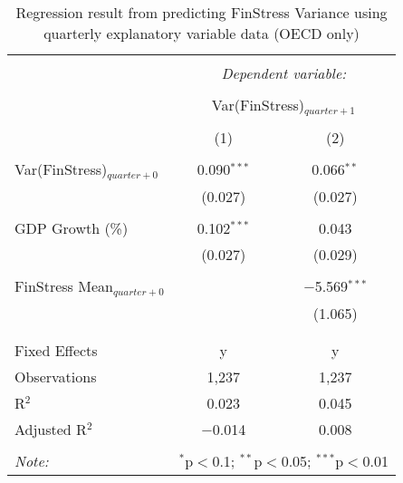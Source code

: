 
\begin{table}[!htbp] \centering 
  \caption{Regression result from predicting FinStress Variance using quarterly explanatory variable data (OECD only)} 
  \label{quarterly_reg} 
\small 
\begin{tabular}{@{\extracolsep{5pt}}lcc} 
\\[-1.8ex]\hline 
\hline \\[-1.8ex] 
 & \multicolumn{2}{c}{\textit{Dependent variable:}} \\ 
\cline{2-3} 
\\[-1.8ex] & \multicolumn{2}{c}{Var(FinStress)$_{quarter+1}$} \\ 
\\[-1.8ex] & (1) & (2)\\ 
\hline \\[-1.8ex] 
 Var(FinStress)$_{quarter + 0}$ & 0.090$^{***}$ & 0.066$^{**}$ \\ 
  & (0.027) & (0.027) \\ 
  & & \\ 
 GDP Growth (\%) & 0.102$^{***}$ & 0.043 \\ 
  & (0.027) & (0.029) \\ 
  & & \\ 
 FinStress Mean$_{quarter + 0}$ &  & $-$5.569$^{***}$ \\ 
  &  & (1.065) \\ 
  & & \\ 
\hline \\[-1.8ex] 
Fixed Effects & y & y \\ 
Observations & 1,237 & 1,237 \\ 
R$^{2}$ & 0.023 & 0.045 \\ 
Adjusted R$^{2}$ & $-$0.014 & 0.008 \\ 
\hline 
\hline \\[-1.8ex] 
\textit{Note:}  & \multicolumn{2}{r}{$^{*}$p$<$0.1; $^{**}$p$<$0.05; $^{***}$p$<$0.01} \\ 
\end{tabular} 
\end{table} 
